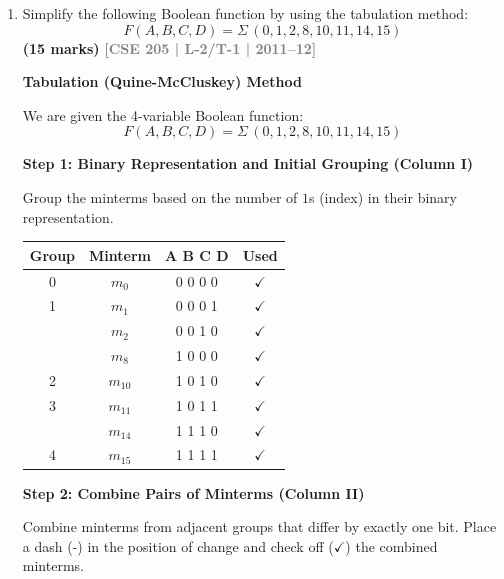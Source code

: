 \documentclass[12pt,a3paper]{article}
\newcommand{\yr}[1]{\hfill\textcolor{gray}{\small\textbf{[#1]}}}
\newcommand{\mk}[1]{\textcolor{orange!70!black}{\small\textbf{(#1 marks)}}}
\begin{document}
\begin{enumerate}
\begin{tcolorbox}[enhanced,breakable,ansbox,colback=cC!4,colframe=cC,boxrule=0.8pt,arc=5pt,title={\textbf{Answer}},fonttitle=\bfseries\color{white},colbacktitle=cC]
\end{tcolorbox}

\item Simplify the following Boolean function by using the tabulation method:
\[ F(A,B,C,D) = \Sigma\,(0,1,2,8,10,11,14,15) \]
\mk{15} \yr{CSE 205 | L-2/T-1 | 2011--12}

\begin{tcolorbox}[enhanced,breakable,ansbox,colback=cC!4,colframe=cC,boxrule=0.8pt,arc=5pt,title={\textbf{Answer}},fonttitle=\bfseries\color{white},colbacktitle=cC]

\textbf{\large Tabulation (Quine-McCluskey) Method}

We are given the 4-variable Boolean function:
\[ F(A,B,C,D) = \Sigma\,(0,1,2,8,10,11,14,15) \]

\vspace{0.5em}
\textbf{Step 1: Binary Representation and Initial Grouping (Column I)}

Group the minterms based on the number of $1$s (index) in their binary representation.

\begin{center}
\begin{tabular}{cccc}
\toprule
\textbf{Group} & \textbf{Minterm} & \textbf{A B C D} & \textbf{Used} \\
\midrule
0 & $m_0$  & 0 0 0 0 & $\checkmark$ \\
\midrule
1 & $m_1$  & 0 0 0 1 & $\checkmark$ \\
  & $m_2$  & 0 0 1 0 & $\checkmark$ \\
  & $m_8$  & 1 0 0 0 & $\checkmark$ \\
\midrule
2 & $m_{10}$ & 1 0 1 0 & $\checkmark$ \\
\midrule
3 & $m_{11}$ & 1 0 1 1 & $\checkmark$ \\
  & $m_{14}$ & 1 1 1 0 & $\checkmark$ \\
\midrule
4 & $m_{15}$ & 1 1 1 1 & $\checkmark$ \\
\bottomrule
\end{tabular}
\end{center}

\vspace{1em}
\textbf{Step 2: Combine Pairs of Minterms (Column II)}

Combine minterms from adjacent groups that differ by exactly one bit. Place a dash (-) in the position of change and check off ($\checkmark$) the combined minterms.


\end{tcolorbox}
\end{enumerate}
\end{document}
